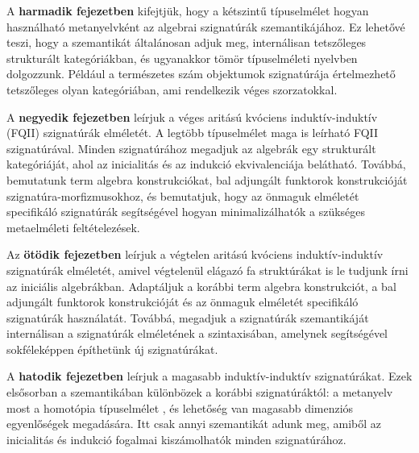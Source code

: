 \documentclass[12pt,a4paper,twoside,openany]{book}
\theoremstyle{remark}
\theoremstyle{definition}
\theoremstyle{theorem}
\begin{document}
A \textbf{harmadik fejezetben} kifejtjük, hogy a kétszintű típuselmélet \cite{twolevel}
hogyan használható metanyelvként az algebrai szignatúrák szemantikájához. Ez
lehetővé teszi, hogy a szemantikát általánosan adjuk meg, internálisan tetszőleges
strukturált kategóriákban, és ugyanakkor tömör típuselméleti nyelvben
dolgozzunk. Például a természetes szám objektumok szignatúrája értelmezhető
tetszőleges olyan kategóriában, ami rendelkezik véges szorzatokkal.

A \textbf{negyedik fejezetben} leírjuk a véges aritású kvóciens
induktív-induktív (FQII) szignatúrák elméletét. A legtöbb típuselmélet maga is
leírható FQII szignatúrával. Minden szignatúrához megadjuk az algebrák egy
strukturált kategóriáját, ahol az inicialitás és az indukció ekvivalenciája
belátható. Továbbá, bemutatunk term algebra konstrukciókat, bal adjungált
funktorok konstrukcióját szignatúra-morfizmusokhoz, és bemutatjuk, hogy az
önmaguk elméletét specifikáló szignatúrák segítségével hogyan minimalizálhatók a
szükséges metaelméleti feltételezések.

Az \textbf{ötödik fejezetben} leírjuk a végtelen aritású kvóciens
induktív-induktív szignatúrák elméletét, amivel végtelenül elágazó fa
struktúrákat is le tudjunk írni az iniciális algebrákban. Adaptáljuk a korábbi
term algebra konstrukciót, a bal adjungált funktorok konstrukcióját és az
önmaguk elméletét specifikáló szignatúrák használatát. Továbbá, megadjuk a
szignatúrák szemantikáját internálisan a szignatúrák elméletének a
szintaxisában, amelynek segítségével sokféleképpen építhetünk új szignatúrákat.

A \textbf{hatodik fejezetben} leírjuk a magasabb induktív-induktív
szignatúrákat. Ezek elsősorban a szemantikában különbözek a korábbi
szignatúráktól: a metanyelv most a homotópia típuselmélet \cite{hottbook}, és
lehetőség van magasabb dimenziós egyenlőségek megadására. Itt csak annyi
szemantikát adunk meg, amiből az inicialitás és indukció fogalmai kiszámolhatók
minden szignatúrához.
\end{document}
